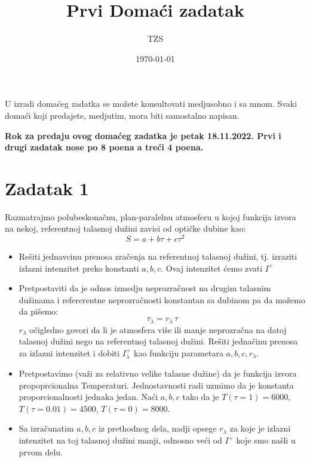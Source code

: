 \documentclass[12pt]{article}
\title{Prvi Doma\'{c}i zadatak}
\author{TZS}
\date{\today}
\begin{document}
\maketitle

U izradi doma\'{c}eg zadatka se mo\v{z}ete konsultovati medjusobno i sa mnom. Svaki doma\'{c}i koji predajete, medjutim, mora biti samostalno napisan. 

\textbf{Rok za predaju ovog doma\'{c}eg zadatka je petak 18.11.2022. Prvi i drugi zadatak nose po 8 poena a tre\'{c}i 4 poena.}

\section*{Zadatak 1}

Razmatrajmo polubeskona\v{c}nu, plan-paralelnu atmosferu u kojoj funkcija izvora na nekoj, referentnoj talasnoj du\v{z}ini zavisi od opti\v{c}ke dubine kao:
\begin{equation}
S = a + b\tau + c \tau^2
\end{equation}

\begin{itemize}
    \item Re\v{s}iti jedna{v}cinu prenosa zra\v{c}enja na referentnoj talasnoj du\v{z}ini, tj. izraziti izlazni intenzitet preko konstanti $a,b,c$. Ovaj intenzitet \'{c}emo zvati $I^+$
    \item Pretpostaviti da je odnos izmedju neprozra\v{c}nost na drugim talasnim du\v{z}inama i refererentne neprozra\v{c}nosti konstantan sa dubinom pa da mo\v{z}emo da pi\v{s}emo: 
    \begin{equation}
    \tau_\lambda = r_\lambda \, \tau
    \end{equation}
    $r_\lambda$ o\v{c}igledno govori da li je atmosfera vi\v{s}e ili manje neprozra\v{c}na na datoj talasnoj du\v{z}ini nego na referentnoj talasnoj du\v{z}ini. Re\v{s}iti jedna\v{c}inu prenosa za izlazni intenzitet i dobiti $I_\lambda^+$ kao funkciju parametara $a, b, c, r_\lambda$.
    \item Pretpostavimo (va\v{z}i za relativno velike talasne du\v{z}ine) da je funkcija izvora propoprcionalna Temperaturi. Jednostavnosti radi uzmimo da je konstanta proporcionalnosti jednaka jedan. Na\'{c}i $a, b, c$ tako da je $T(\tau=1) = 6000$, $T(\tau=0.01) = 4500$, $T(\tau=0) = 8000$. 
    \item Sa izra\v{c}unatim $a,b,c$ iz prethodnog dela, nadji opsege $r_\lambda$ za koje je izlazni intenzitet na toj talasnoj du\v{z}ini manji, odnosno ve\'{c}i od $I^+$ koje smo na\v{s}li u prvom delu.
\end{itemize}
\end{document}
